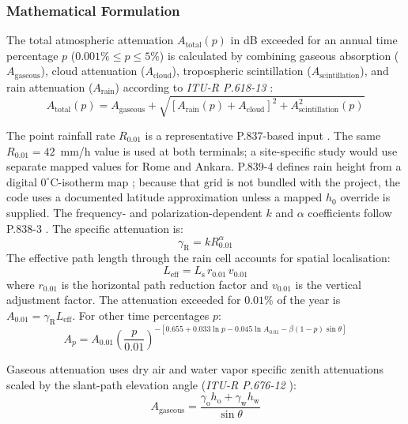 \subsubsection{Mathematical Formulation}
The total atmospheric attenuation $A_{\mathrm{total}}(p)$ in dB exceeded for an annual time percentage $p$ ($0.001\% \le p \le 5\%$) is calculated by combining gaseous absorption ($A_{\mathrm{gaseous}}$), cloud attenuation ($A_{\mathrm{cloud}}$), tropospheric scintillation ($A_{\mathrm{scintillation}}$), and rain attenuation ($A_{\mathrm{rain}}$) according to \textit{ITU-R P.618-13} \cite{itu618}:
\begin{equation}
    A_{\mathrm{total}}(p)
    =
    A_{\mathrm{gaseous}}
    +
    \sqrt{
    \left[A_{\mathrm{rain}}(p)+A_{\mathrm{cloud}}\right]^2
    +
    A_{\mathrm{scintillation}}^2(p)
    }
\end{equation}

The point rainfall rate $R_{0.01}$ is a representative P.837-based input \cite{itu837}. The same $R_{0.01}=42$~mm/h value is used at both terminals; a site-specific study would use separate mapped values for Rome and Ankara. P.839-4 defines rain height from a digital $0^\circ$C-isotherm map \cite{itu839}; because that grid is not bundled with the project, the code uses a documented latitude approximation unless a mapped $h_0$ override is supplied. The frequency- and polarization-dependent $k$ and $\alpha$ coefficients follow P.838-3 \cite{itu838}. The specific attenuation is:
\begin{equation}
    \gamma_{\mathrm{R}} = k R_{0.01}^{\alpha}
\end{equation}
The effective path length through the rain cell accounts for spatial localisation:
\begin{equation}
    L_{\mathrm{eff}} = L_{\mathrm{s}}\,r_{0.01}\,v_{0.01}
\end{equation}
where $r_{0.01}$ is the horizontal path reduction factor and $v_{0.01}$ is the vertical adjustment factor. The attenuation exceeded for $0.01\%$ of the year is $A_{0.01} = \gamma_{\mathrm{R}} L_{\mathrm{eff}}$. For other time percentages $p$:
\begin{equation}
    A_p = A_{0.01} \left( \frac{p}{0.01} \right)^{-\left[0.655 + 0.033\ln p - 0.045\ln A_{0.01} - \beta(1-p)\sin\theta\right]}
\end{equation}

Gaseous attenuation uses dry air and water vapor specific zenith attenuations scaled by the slant-path elevation angle (\textit{ITU-R P.676-12} \cite{itu676}):
\begin{equation}
    A_{\mathrm{gaseous}}
    =
    \frac{\gamma_{\mathrm{o}}h_{\mathrm{o}}+\gamma_{\mathrm{w}}h_{\mathrm{w}}}{\sin\theta}
\end{equation}

